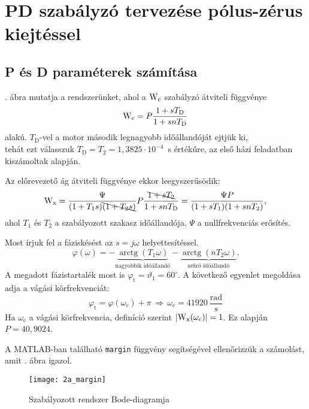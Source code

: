 \section{PD szabályzó tervezése pólus-zérus kiejtéssel}

\subsection{P és D paraméterek számítása}

. ábra mutatja a rendszerünket, ahol a $ \mathrm{W}_\text{c} $ szabályzó átviteli függvénye
\begin{equation}
	\mathrm{W}_\text{c} = P\frac{1+sT_\text{D}}{1+snT_\text{D}}
\end{equation}
alakú.
$T_\text{D}$-vel a motor második legnagyobb időállandóját ejtjük ki,\\
tehát ezt válasszuk \mbox{$T_\text{D}=T_2=1,3825\cdot 10^{-4}$ s} értékűre,
az első házi feladatban kiszámoltak alapján.

Az előrevezető ág átviteli függvénye ekkor leegyszerűsödik:
\begin{equation}
	\mathrm{W}_\text{x}
	= \frac{\Psi}{(1+T_1s)\bcancel{(1+T_2s)}}P\frac{\bcancel{1+sT_\text{2} }}{1+snT_\text{D}}
	= \frac{\Psi P}{(1+sT_1)(1+snT_2)},
\end{equation}
ahol $T_1$ és $T_2$ a szabályozott szakasz időállandója, $\Psi$ a nullfrekvenciás erősítés.

Most írjuk fel a fáziskésést az $s=j\omega$ helyettesítéssel.
\begin{equation}
	\varphi(\omega) = -\underbrace{\operatorname{arctg}(T_1\omega)}_\text{nagyobbik időállandó} -\underbrace{\operatorname{arctg}(nT_2\omega)}_\text{szűrő időállandó}.
\end{equation}
A megadott fázistartalék most is $\varphi_\text{t} = \vartheta_1=60^\circ$. A következő egyenlet megoldása adja a vágási
körfrekvenciát:
\begin{equation}
	\varphi_\text{t} = \varphi(\omega_c) +\pi \,\Rightarrow\, \omega_\text{c} = 41920~\frac{\text{rad}}{\text{s}}
\end{equation}
Ha $\omega_\text{c}$ a vágási körfrekvencia, definíció szerint $\left\lvert \mathrm{W}_\text{x}(\omega_\text{c}) \right\rvert = 1$.
Ez alapján $ P = 40,9024$.

A MATLAB-ban található \verb|margin| függvény segítségével ellenőrizzük a számolást, amit . ábra igazol.
\begin{figure}[H]
	\centering
	\texttt{[image: 2a\_margin]}
	\caption{Szabályozott rendszer Bode-diagramja}
	\label{fig:2a_margin}
\end{figure}


